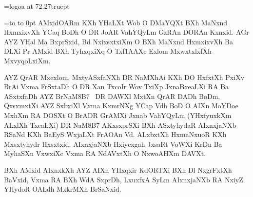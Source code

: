 \font\logoa=logoa at 72.27truept



=\hbox to 
\vtop to 0pt{\kern-3cm\vfill}
AMxidOARm KXh YHaLXt Wob O DMaYQXt BXh MaNxnd HxmxixvXh YCaq BoDh O DR JoAR 
VahYQyLm GzRAn DORAn Kxnxid. AGr AYZ YHal Ma BxprSxid, Bd NxixsxtxiXm O BXh MaNxnd HxmxixvXh 
Ba DLXi Pr AMxid BXh TyhxqxiXq O Txf\11AAXc Exlom MxwxtxlxfXh MxvyqoLxiXm.  

AYZ QrAR Mxexlom, MxtyASxfaNXh DR NaMXhAi KXh DO HxfxtXh PxiXv BrAi Vxma FrSxtaDh  O 
DR Xan TxcoIr Wov TxiXp JxnaBxeaLXi RA Ba ASxtxfaDh AYZ BrNaM\18B7 \ylTXkFaRSXi\
DR DAWXl MxtXn QrAR DADh BoDm, QxsxmxtXi AYZ 
SxbxiXl Vxma KxmrNXg YCap Vdh BoD O AIXn MoYDoe MxhXm RA DOSXt O BrADR GrAMXi
Jxnab {\Sxiah VahYQyLm} (YHxfyuxkXm ALxlXh TxeaLXi) DR NaM\18B7 AKxsxprSXi BXh ASxtyhydaR AIxnxjaNXb
RSaNd KXh BaEyS WxjaLXt FrAOAn Vd. ALxbxtXh HxmaNxuoR KXh  Mxsxtyhydr
Hxsxtxid, AIxnxjaNXb Hxiycxgah JxsaRt VoWXi KrDn Ba MyhaSXn VxwxiXc Vxma RA NdAVxtXh
O NxwoAHXm DAVXt. 

BXh AMxid AIxnxkXh AYZ AIXn YHxqxir KdORTXi BXh Dl NxgrFxtXh BaVxid, Vxma RA BXh
WdA SxprDh, LxuxfxA SyLm AIxnxjaNXb RA NxiyZ YHydoR OALdh MxkrMXh BrSaNxid.





